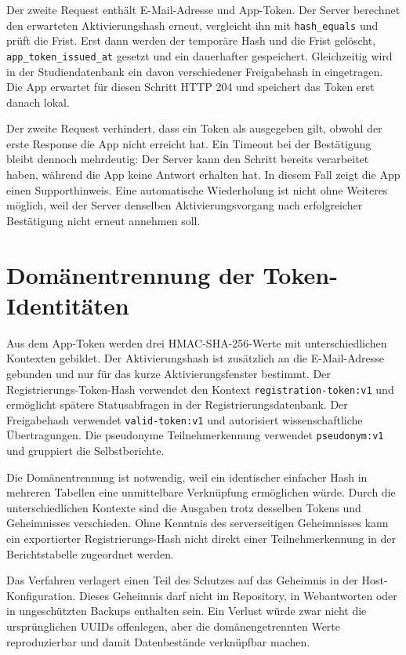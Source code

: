 Der zweite Request enthält E-Mail-Adresse und App-Token. Der Server berechnet den erwarteten Aktivierungshash erneut, vergleicht ihn mit \texttt{hash\_equals} und prüft die Frist. Erst dann werden der temporäre Hash und die Frist gelöscht, \texttt{app\_token\_issued\_at} gesetzt und ein dauerhafter  gespeichert. Gleichzeitig wird in der Studiendatenbank ein davon verschiedener Freigabehash in  eingetragen. Die App erwartet für diesen Schritt HTTP 204 und speichert das Token erst danach lokal.

Der zweite Request verhindert, dass ein Token als ausgegeben gilt, obwohl der erste Response die App nicht erreicht hat. Ein Timeout bei der Bestätigung bleibt dennoch mehrdeutig: Der Server kann den Schritt bereits verarbeitet haben, während die App keine Antwort erhalten hat. In diesem Fall zeigt die App einen Supporthinweis. Eine automatische Wiederholung ist nicht ohne Weiteres möglich, weil der Server denselben Aktivierungsvorgang nach erfolgreicher Bestätigung nicht erneut annehmen soll.

\section{Domänentrennung der Token-Identitäten}

Aus dem App-Token werden drei HMAC-SHA-256-Werte mit unterschiedlichen Kontexten gebildet. Der Aktivierungshash ist zusätzlich an die E-Mail-Adresse gebunden und nur für das kurze Aktivierungsfenster bestimmt. Der Registrierungs-Token-Hash verwendet den Kontext \texttt{registration-token:v1} und ermöglicht spätere Statusabfragen in der Registrierungsdatenbank. Der Freigabehash verwendet \texttt{valid-token:v1} und autorisiert wissenschaftliche Übertragungen. Die pseudonyme Teilnehmerkennung verwendet \texttt{pseudonym:v1} und gruppiert die Selbstberichte.

Die Domänentrennung ist notwendig, weil ein identischer einfacher Hash in mehreren Tabellen eine unmittelbare Verknüpfung ermöglichen würde. Durch die unterschiedlichen Kontexte sind die Ausgaben trotz desselben Tokens und Geheimnisses verschieden. Ohne Kenntnis des serverseitigen Geheimnisses kann ein exportierter Registrierungs-Hash nicht direkt einer Teilnehmerkennung in der Berichtstabelle zugeordnet werden.

Das Verfahren verlagert einen Teil des Schutzes auf das Geheimnis in der Host-Konfiguration. Dieses Geheimnis darf nicht im Repository, in Webantworten oder in ungeschützten Backups enthalten sein. Ein Verlust würde zwar nicht die ursprünglichen UUIDs offenlegen, aber die domänengetrennten Werte reproduzierbar und damit Datenbestände verknüpfbar machen.

